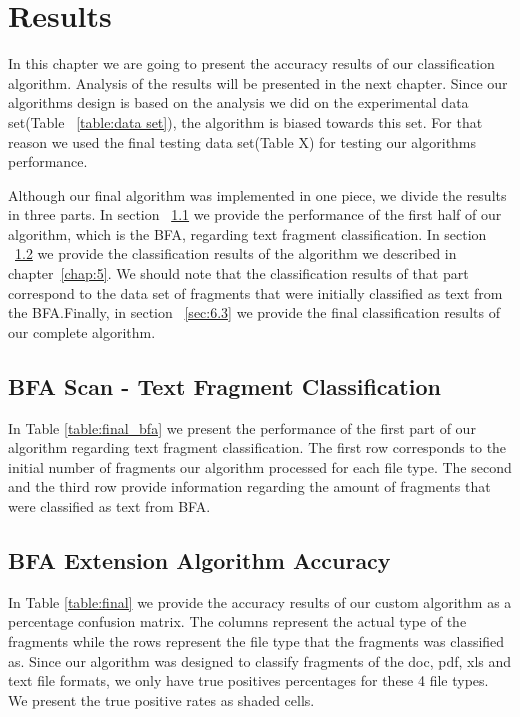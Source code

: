\chapter{Results}\label{chap:6}
In this chapter we are going to present the accuracy results of our classification algorithm. Analysis of the results will be presented in the next chapter.
Since our algorithms design is based on the analysis we did on the experimental data set(Table ~\ref{table:data set}), the algorithm is biased towards this set. For that reason we used the final testing data set(Table X) for testing our algorithms performance.

Although our final algorithm was implemented in one piece, we divide the results in three parts. In section ~\ref{sec:6.1} we  provide the performance of the first half of our algorithm, which is the BFA, regarding text fragment classification. In section ~\ref{sec:6.2} we provide the classification results of the algorithm we described in chapter~\ref{chap:5}. We should note that the classification results of that part correspond to the data set of fragments that were initially classified as text from the BFA.Finally, in section ~\ref{sec:6.3} we provide the final classification results of our complete algorithm. 
\pagebreak

\section{BFA Scan - Text Fragment Classification}\label{sec:6.1}
In Table \ref{table:final_bfa} we present the performance of the first part of our algorithm regarding text fragment classification. The first row corresponds to the initial number of fragments our algorithm processed for each file type. The second and the third row provide information regarding the amount of fragments that were classified as text from BFA.





\section{BFA Extension Algorithm Accuracy}\label{sec:6.2}
In Table \ref{table:final} we provide the accuracy results of our custom  algorithm as a percentage confusion matrix. The columns represent the actual type of the fragments while the rows represent the file type that the fragments was classified as. Since our algorithm was designed to classify fragments of the doc, pdf, xls and text file formats, we only have true positives percentages for these 4 file types. We present the true positive rates as shaded cells.

